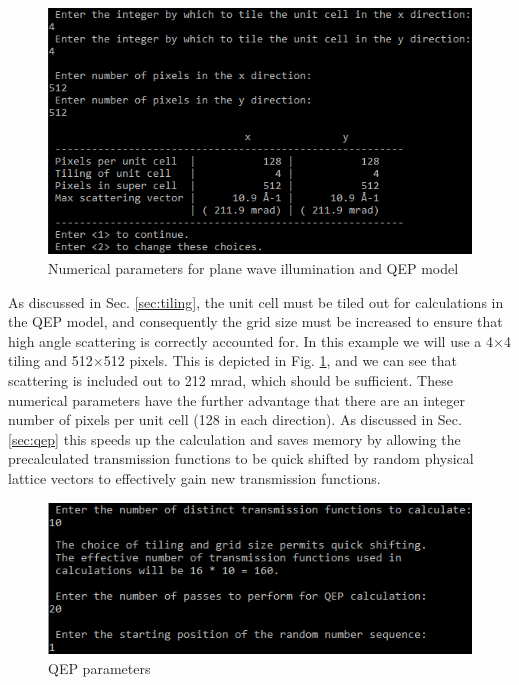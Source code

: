 \documentclass[12pt,a4paper]{article}
\newcommand{\by}{$\times$}
\begin{document}
\begin{figure}[!h]
\begin{center}
    \includegraphics[scale=0.75]{pw_qep_numerical.png}
\caption{Numerical parameters for plane wave illumination and QEP model}
\label{fig:pw_qep_numerical}
\end{center}
\end{figure}

As discussed in Sec. \ref{sec:tiling}, the unit cell must be tiled out for calculations in the QEP model, and consequently the grid size must be increased to ensure that high angle scattering is correctly accounted for.
In this example we will use a 4\by4 tiling and 512\by512 pixels.
This is depicted in Fig. \ref{fig:pw_qep_numerical}, and we can see that scattering is included out to 212 mrad, which should be sufficient.
These numerical parameters have the further advantage that there are an integer number of pixels per unit cell (128 in each direction).
As discussed in Sec. \ref{sec:qep} this speeds up the calculation and saves memory by allowing the precalculated transmission functions to be quick shifted by random physical lattice vectors to effectively gain new transmission functions.

\begin{figure}[!h]
\begin{center}
    \includegraphics[scale=0.75]{pw_qep_qep_questions.png}
\caption{QEP parameters}
\label{fig:pw_qep_qep_questions}
\end{center}
\end{figure}
\end{document}
